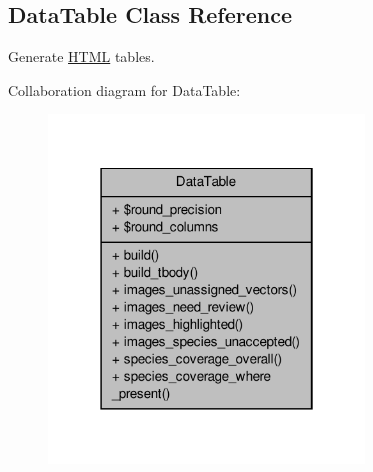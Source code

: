 \hypertarget{classDataTable}{\subsection{Data\-Table Class Reference}
\label{classDataTable}
}


Generate \hyperlink{classHTML}{H\-T\-M\-L} tables.  




Collaboration diagram for Data\-Table\-:\nopagebreak
\begin{figure}[H]
\begin{center}
\leavevmode
\includegraphics[width=238pt]{classDataTable__coll__graph}
\end{center}
\end{figure}
